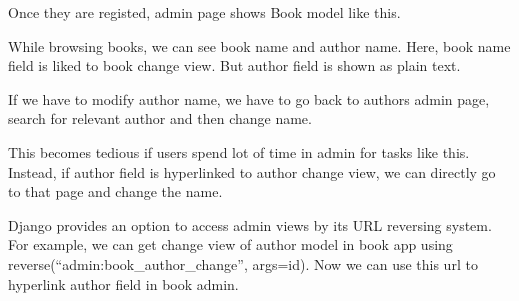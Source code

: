 \documentclass[letterpaper,11pt,english]{sphinxmanual}
\begin{document}
Once they are registed, admin page shows Book model like this.


While browsing books, we can see book name and author name. Here, book name field is liked to book change view. But author field is shown as plain text.

If we have to modify author name, we have to go back to authors admin page, search for relevant author and then change name.

This becomes tedious if users spend lot of time in admin for tasks like this. Instead, if author field is hyperlinked to author change view, we can directly go to that page and change the name.

Django provides an option to access admin views by its URL reversing system. For example, we can get change view of author model in book app using reverse(“admin:book\_author\_change”, args=id). Now we can use this url to hyperlink author field in book admin.

\begin{sphinxVerbatim}[commandchars=\\\{\}]
   
   


 
        

      
           \PYG{p}{[}\PYG{p}{]}
             
         
      
\end{sphinxVerbatim}
\end{document}
